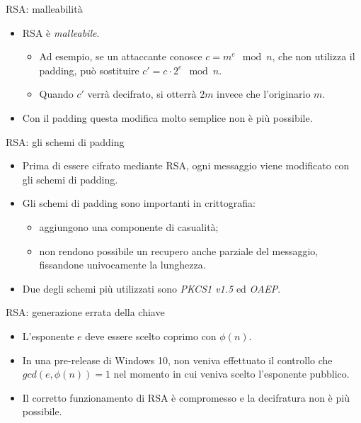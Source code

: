 \documentclass[11pt,svgnames,smaller,aspectratio=169,italian]{beamer}
\begin{document}
\begin{frame}{RSA: malleabilità}
	\begin{itemize}
		\item RSA è \emph{malleabile}.
			\begin{itemize}
				\item Ad esempio, se un attaccante conosce $c = m^{e} \mod n$, che non utilizza il padding, può sostituire $c' = c \cdot 2^{e} \mod n$.
				\item Quando $c'$ verrà decifrato, si otterrà $2m$ invece che l'originario $m$.
			\end{itemize}
		\item Con il padding questa modifica molto semplice non è più possibile.
	\end{itemize}
\end{frame}

\begin{frame}{RSA: gli schemi di padding}
	\begin{itemize}
		\item Prima di essere cifrato mediante RSA, ogni messaggio viene modificato con gli schemi di padding.
		\item Gli schemi di padding sono importanti in crittografia:
			\begin{itemize}
				\item aggiungono una componente di casualità;
				\item non rendono possibile un recupero anche parziale del messaggio, fissandone univocamente la lunghezza.
			\end{itemize}
		\item Due degli schemi più utilizzati sono \emph{PKCS1 v1.5} ed \emph{OAEP}.
	\end{itemize}
\end{frame}

\begin{frame}{RSA: generazione errata della chiave}
	\begin{itemize}
		\item L'esponente $e$ deve essere scelto coprimo con $\phi(n)$.
		\item In una pre-release di Windows 10, non veniva effettuato il controllo che $gcd(e,\phi(n)) = 1$ nel momento in cui veniva scelto l'esponente pubblico.
		\item Il corretto funzionamento di RSA è compromesso e la decifratura non è più possibile.
	\end{itemize}
\end{frame}
\end{document}
